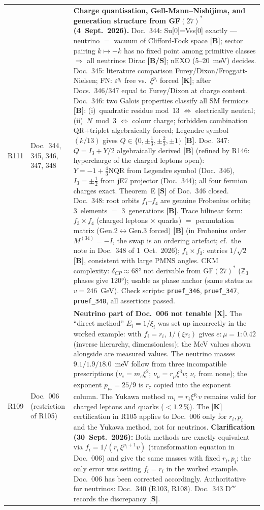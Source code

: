 \begin{longtable}{@{}p{0.9cm}p{3.1cm}p{10.2cm}@{}}
R111 & Doc.~344, 345, 346, 347, 348 & \textbf{Charge quantisation, Gell-Mann--Nishijima, and generation structure from GF$(27)^*$ (4~Sept.~2026).} Doc.~344: Su[0]=Vss[0] exactly --- neutrino $=$ vacuum of Clifford-Fock space \textbf{[B]}; sector pairing $k\mapsto-k$ has no fixed point among primitive classes $\Rightarrow$ all neutrinos Dirac \textbf{[B/S]}; nEXO (5--20~meV) decides. Doc.~345: literature comparison Furey/Dixon/Froggatt-Nielsen; FN: $\varepsilon^{q_i}$ free vs.\ $\xi^{p_i}$ forced \textbf{[K]}; after Docs.~346/347 equal to Furey/Dixon at charge content. Doc.~346: two Galois properties classify all SM fermions \textbf{[B]}: (i)~quadratic residue mod~13 $\Leftrightarrow$ electrically neutral; (ii)~$N\bmod3$ $\Leftrightarrow$ colour charge; forbidden combination QR+triplet algebraically forced; Legendre symbol $(k/13)$ gives $Q\in\{0,\pm\tfrac{1}{3},\pm\tfrac{2}{3},\pm1\}$ \textbf{[B]}. Doc.~347: $Q=I_3+Y/2$ algebraically derived \textbf{[B]} (refined by R146: hypercharge of the charged leptons open): $Y=-1+\tfrac{4}{3}\mathrm{NQR}$ from Legendre symbol (Doc.~346), $I_3=\pm\tfrac{1}{2}$ from jE7 projector (Doc.~344); all four fermion charges exact. Theorem~E \textbf{[S]} of Doc.~346 closed. Doc.~348: root orbits $f_1$--$f_4$ are genuine Frobenius orbits; 3~elements $=$ 3~generations \textbf{[B]}. Trace bilinear form: $f_3\times f_4$ (charged leptons $\times$ quarks) $=$ permutation matrix (Gen.$2\leftrightarrow$Gen.$3$ forced) \textbf{[B]} (in Frobenius order $M^{(34)}=-I$, the swap is an ordering artefact; cf.\ the note in Doc.~348 of 1~Oct.~2026); $f_1\times f_3$: entries $1/\sqrt{2}$ \textbf{[B]}, consistent with large PMNS angles. CKM complexity: $\delta_{CP}\approx68°$ not derivable from GF$(27)^*$ ($\mathbb{Z}_3$ phases give 120°); usable as phase anchor (same status as $v=246$~GeV). Check scripts: \texttt{pruef\_346}, \texttt{pruef\_347}, \texttt{pruef\_348}, all assertions passed. \\
R109 & Doc.~006 (restriction of R105) & \textbf{Neutrino part of Doc.~006 not tenable [X].} The ``direct method'' $E_i=1/\xi_i$ was set up incorrectly in the worked example: with $f_i=r_i$, $1/(\xi r_i)$ gives $e{:}\mu = 1{:}0.42$ (inverse hierarchy, dimensionless); the MeV values shown alongside are measured values. The neutrino masses $9.1/1.9/18.0$~meV follow from three incompatible prescriptions ($\nu_e=m_e\xi^2$; $\nu_\mu=r_\mu\xi^3 v$; $\nu_\tau$ from none); the exponent $p_{\nu_\tau}=25/9$ is $r_\tau$ copied into the exponent column. The Yukawa method $m_i=r_i\xi^{p_i}v$ remains valid for charged leptons and quarks ($<1.2\,\%$). The \textbf{[K]} certification in R105 applies to Doc.~006 only for $r_i,p_i$ and the Yukawa method, not for neutrinos. \textbf{Clarification (30~Sept.~2026):} Both methods are exactly equivalent via $f_i=1/(r_i\,\xi^{p_i+1}v)$ (transformation equation in Doc.~006) and give the same masses with fixed $r_i,p_i$; the only error was setting $f_i=r_i$ in the worked example. Doc.~006 has been corrected accordingly. Authoritative for neutrinos: Doc.~340 (R103, R108). Doc.~343 D$'''$ records the discrepancy \textbf{[S]}. \\

\end{longtable}
